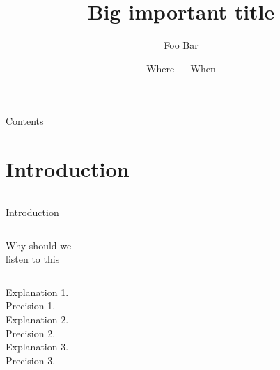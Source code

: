 \documentclass[thicklines,fleqn,xcolor=dvipsnames,compress,12pt,aspectratio=169]{beamer}
\title{Big important title}
\author{Foo Bar}
\date{Where --- When}
\begin{document}


\begin{frame}{}
    \maketitle
    
\end{frame}


\begin{frame}{Contents}
    
    \tableofcontents[hideallsubsections]
    
\end{frame}


\section{Introduction}

\begin{frame}
    
    \begin{columns}
            {\Large Introduction}
    \end{columns}
    
\end{frame}

\begin{frame}{Why should we\\ listen to this}
    
    \begin{columns}
            {\large Explanation 1.}\\
            {\color{gray} Precision 1.}\\\vspace{1em}
            {\large Explanation 2.}\\
            {\color{gray} Precision 2.}\\\vspace{1em} 
            {\large Explanation 3.}\\
            {\color{gray} Precision 3.}
            
    \end{columns}
    
\end{frame}
\end{document}
